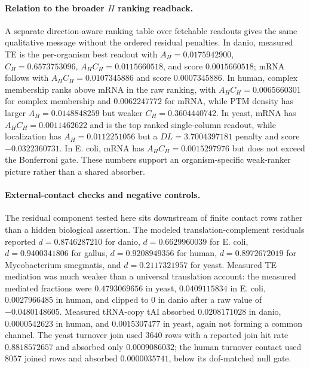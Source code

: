 \paragraph{Relation to the broader $H$ ranking readback.}
A separate direction-aware ranking table over fetchable readouts gives the same qualitative message without the ordered residual penalties.  In danio, measured TE is the per-organism best readout with $A_H=0.0175942900$, $C_H=0.6573753096$, $A_HC_H=0.0115660518$, and score $0.0015660518$; mRNA follows with $A_HC_H=0.0107345886$ and score $0.0007345886$.  In human, complex membership ranks above mRNA in the raw ranking, with $A_HC_H=0.0065660301$ for complex membership and $0.0062247772$ for mRNA, while PTM density has larger $A_H=0.0148848259$ but weaker $C_H=0.3604440742$.  In yeast, mRNA has $A_HC_H=0.0011462622$ and is the top ranked single-column readout, while localization has $A_H=0.0112251056$ but a $DL=3.7004397181$ penalty and score $-0.0322360731$.  In E. coli, mRNA has $A_HC_H=0.0015297976$ but does not exceed the Bonferroni gate.  These numbers support an organism-specific weak-ranker picture rather than a shared absorber.

\paragraph{External-contact checks and negative controls.}
The residual component tested here sits downstream of finite contact rows rather than a hidden biological assertion.  The modeled translation-complement residuals reported $d=0.8746287210$ for danio, $d=0.6629960039$ for E. coli, $d=0.9400341806$ for gallus, $d=0.9208949356$ for human, $d=0.8972672019$ for Mycobacterium smegmatis, and $d=0.2117321957$ for yeast.  Measured TE mediation was much weaker than a universal translation account: the measured mediated fractions were $0.4793069656$ in yeast, $0.0409115834$ in E. coli, $0.0027966485$ in human, and clipped to $0$ in danio after a raw value of $-0.0480148605$.  Measured tRNA-copy tAI absorbed $0.0208171028$ in danio, $0.0000542623$ in human, and $0.0015307477$ in yeast, again not forming a common channel.  The yeast turnover join used $3640$ rows with a reported join hit rate $0.8818572657$ and absorbed only $0.0009086032$; the human turnover contact used $8057$ joined rows and absorbed $0.0000035741$, below its dof-matched null gate.

